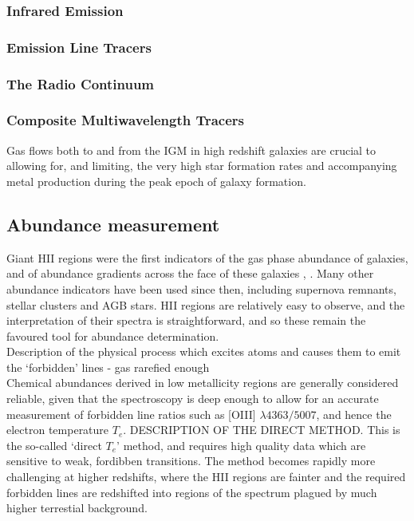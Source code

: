 \documentclass{literature}
\begin{document}
\subsubsection{Infrared Emission}


\subsubsection{Emission Line Tracers}

\subsubsection{The Radio Continuum}




\subsubsection{Composite Multiwavelength Tracers}



Gas flows both to and from the IGM in high redshift galaxies are crucial to allowing for, and limiting, the very high star formation rates and accompanying metal production during the peak epoch of galaxy formation. \\

\subsection{Abundance measurement}
Giant HII regions were the first indicators of the gas phase abundance of galaxies, and of abundance gradients across the face of these galaxies \citep{Searle1971}, \citep{Shields1974}. Many other abundance indicators have been used since then, including supernova remnants, stellar clusters and AGB stars. HII regions are relatively easy to observe, and the interpretation of their spectra is straightforward, and so these remain the favoured tool for abundance determination.  \\


Description of the physical process which excites atoms and causes them to emit the `forbidden' lines - gas rarefied enough \\


Chemical abundances derived in low metallicity regions are generally considered reliable, given that the spectroscopy is deep enough to allow for an accurate measurement of forbidden line ratios such as [OIII] $\lambda 4363/5007$, and hence the electron temperature $T_{e}$. DESCRIPTION OF THE DIRECT METHOD. This is the so-called `direct $T_{e}$' method, and requires high quality data which are sensitive to weak, fordibben transitions. The method becomes rapidly more challenging at higher redshifts, where the HII regions are fainter and the required forbidden lines are redshifted into regions of the spectrum plagued by much higher terrestial background. \\   
\end{document}
